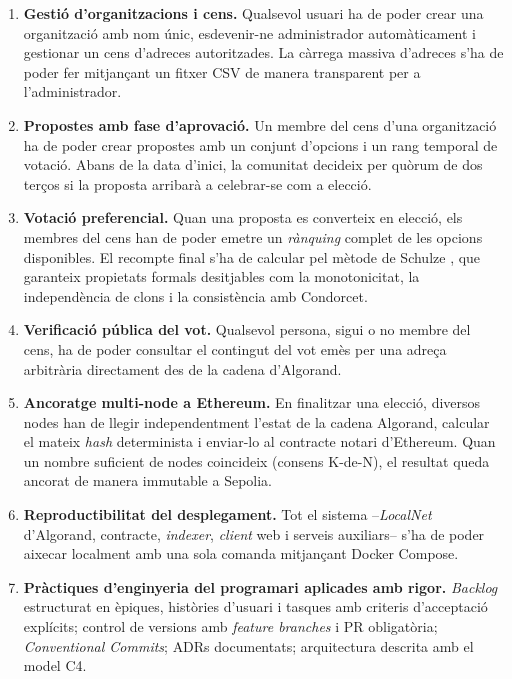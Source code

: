 \begin{enumerate}
    \item \textbf{Gestió d'organitzacions i cens.} Qualsevol usuari ha de
    poder crear una organització amb nom únic, esdevenir-ne administrador
    automàticament i gestionar un cens d'adreces autoritzades. La càrrega
    massiva d'adreces s'ha de poder fer mitjançant un fitxer \ac{CSV} de
    manera transparent per a l'administrador.

    \item \textbf{Propostes amb fase d'aprovació.} Un membre del cens
    d'una organització ha de poder crear propostes amb un conjunt
    d'opcions i un rang temporal de votació. Abans de la data d'inici,
    la comunitat decideix per quòrum de dos terços si la proposta
    arribarà a celebrar-se com a elecció.

    \item \textbf{Votació preferencial.} Quan una proposta es converteix
    en elecció, els membres del cens han de poder emetre un
    \emph{rànquing} complet de les opcions disponibles. El recompte
    final s'ha de calcular pel mètode de Schulze \cite{schulze2011newmethod},
    que garanteix propietats formals desitjables com la monotonicitat,
    la independència de clons i la consistència amb Condorcet.

    \item \textbf{Verificació pública del vot.} Qualsevol persona,
    sigui o no membre del cens, ha de poder consultar el contingut del
    vot emès per una adreça arbitrària directament des de la cadena
    d'Algorand.

    \item \textbf{Ancoratge multi-node a Ethereum.} En finalitzar una
    elecció, diversos nodes han de llegir independentment l'estat de la
    cadena Algorand, calcular el mateix \emph{hash} determinista i
    enviar-lo al contracte notari d'Ethereum. Quan un nombre suficient
    de nodes coincideix (consens K-de-N), el resultat queda ancorat de
    manera immutable a Sepolia.

    \item \textbf{Reproductibilitat del desplegament.} Tot el sistema
    --\emph{LocalNet} d'Algorand, contracte, \emph{indexer},
    \emph{client} web i serveis auxiliars-- s'ha de poder aixecar
    localment amb una sola comanda mitjançant Docker Compose.

    \item \textbf{Pràctiques d'enginyeria del programari aplicades amb
    rigor.} \emph{Backlog} estructurat en èpiques, històries d'usuari i
    tasques amb criteris d'acceptació explícits; control de versions
    amb \emph{feature branches} i \ac{PR} obligatòria; \emph{Conventional
    Commits}; \acp{ADR} documentats; arquitectura descrita amb el model
    C4.
\end{enumerate}

